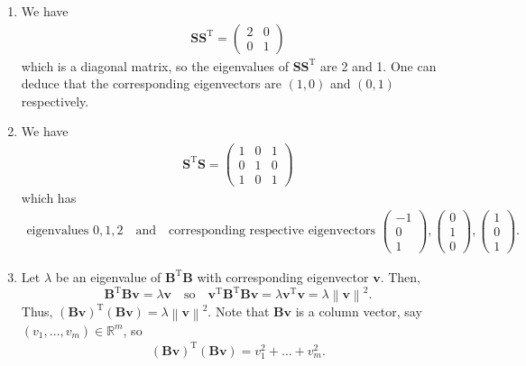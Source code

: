 \documentclass[12pt]{article}
\begin{document}
\begin{enumerate}[label=\textbf{(\alph*)}]
    \itemsep 0em
    \item We have \begin{align*}
        \mathbf{SS}^\text{T}=\begin{pmatrix}2&0\\ 0&1\end{pmatrix}
    \end{align*}
    which is a diagonal matrix, so the eigenvalues of $\mathbf{SS}^\text{T}$ are 2 and 1. One can deduce that the corresponding eigenvectors are $\left(1,0\right)$ and $\left(0,1\right)$ respectively.
    \item We have \begin{align*}
        \mathbf{S}^\text{T}\mathbf{S}=\begin{pmatrix}1&0&1\\ 0&1&0\\ 1&0&1\end{pmatrix}
    \end{align*}
    which has \begin{align*}
        \text{eigenvalues } 0,1,2\quad\text{and}\quad\text{corresponding respective eigenvectors }\begin{pmatrix}
            -1\\0\\1
        \end{pmatrix},\begin{pmatrix}
            0\\1\\0
        \end{pmatrix},\begin{pmatrix}
            1\\0\\1
        \end{pmatrix}.
    \end{align*}
    \item Let $\lambda$ be an eigenvalue of $\mathbf{B}^\text{T}\mathbf{B}$ with corresponding eigenvector $\mathbf{v}$. Then, \[\mathbf{B}^\text{T}\mathbf{B}\mathbf{v}=\lambda\mathbf{v}\quad \text{so}\quad \mathbf{v}^\text{T}\mathbf{B}^\text{T}\mathbf{B}\mathbf{v}=\lambda\mathbf{v}^\text{T}\mathbf{v}=\lambda\left\|\mathbf{v}\right\|^2.\]
   Thus, $\left(\mathbf{Bv}\right)^\text{T}\left(\mathbf{Bv}\right)=\lambda\left\|\mathbf{v}\right\|^2$. Note that $\mathbf{Bv}$ is a column vector, say $\left(v_1,\ldots,v_m\right)\in\mathbb{R}^m$, so \begin{align*}
       \left(\mathbf{Bv}\right)^\text{T}\left(\mathbf{Bv}\right)=v_1^2+\ldots+v_m^2.

\end{align*}
\end{enumerate}
\end{document}
